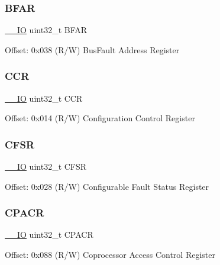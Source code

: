 \subsubsection{\texorpdfstring{B\+F\+AR}{BFAR}}
{\footnotesize\ttfamily \mbox{\hyperlink{core__cm3_8h_aec43007d9998a0a0e01faede4133d6be}{\+\_\+\+\_\+\+IO}} uint32\+\_\+t B\+F\+AR}

Offset\+: 0x038 (R/W) Bus\+Fault Address Register \mbox{\label{struct_s_c_b___type_a5e1322e27c40bf91d172f9673f205c97}} 
\subsubsection{\texorpdfstring{C\+CR}{CCR}}
{\footnotesize\ttfamily \mbox{\hyperlink{core__cm3_8h_aec43007d9998a0a0e01faede4133d6be}{\+\_\+\+\_\+\+IO}} uint32\+\_\+t C\+CR}

Offset\+: 0x014 (R/W) Configuration Control Register \mbox{\label{struct_s_c_b___type_ae6b1e9cde3f94195206c016214cf3936}} 
\subsubsection{\texorpdfstring{C\+F\+SR}{CFSR}}
{\footnotesize\ttfamily \mbox{\hyperlink{core__cm3_8h_aec43007d9998a0a0e01faede4133d6be}{\+\_\+\+\_\+\+IO}} uint32\+\_\+t C\+F\+SR}

Offset\+: 0x028 (R/W) Configurable Fault Status Register \mbox{\label{struct_s_c_b___type_acccaf5688449c8253e9952ddc2161528}} 
\subsubsection{\texorpdfstring{C\+P\+A\+CR}{CPACR}}
{\footnotesize\ttfamily \mbox{\hyperlink{core__cm3_8h_aec43007d9998a0a0e01faede4133d6be}{\+\_\+\+\_\+\+IO}} uint32\+\_\+t C\+P\+A\+CR}

Offset\+: 0x088 (R/W) Coprocessor Access Control Register \mbox{\label{struct_s_c_b___type_a30abfea43143a424074f682bd61eace0}} 
